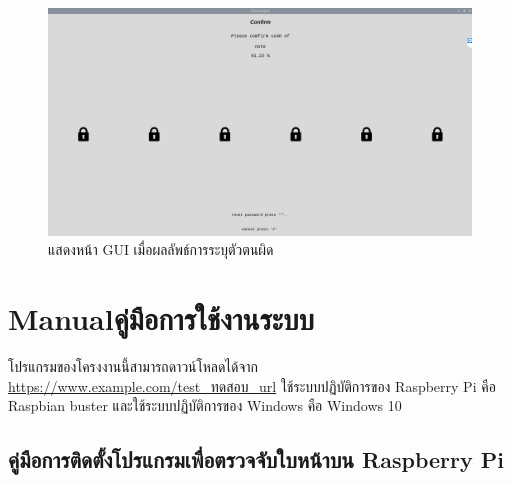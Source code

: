 \begin{figure}[!ht]
    \begin{center}
      \includegraphics[scale=.35]{pic/comfirm_page.png}
      \caption[wrong predict]{แสดงหน้า GUI เมื่อผลลัพธ์การระบุตัวตนผิด}
      \label{fig:com_page}
    \end{center}
  \end{figure}
















\chapter{\ifenglish Manual\else คู่มือการใช้งานระบบ\fi}

โปรแกรมของโครงงานนี้สามารถดาวน์โหลดได้จาก \url{https://www.example.com/test_ทดสอบ_url} 
ใช้ระบบปฏิบัติการของ Raspberry Pi คือ Raspbian buster และใช้ระบบปฏิบัติการของ Windows คือ Windows 10

\section{คู่มือการติดตั้งโปรแกรมเพื่อตรวจจับใบหน้าบน Raspberry Pi}
